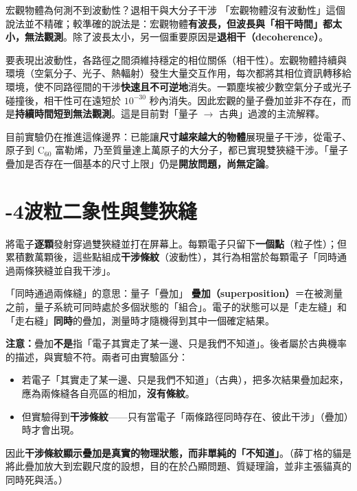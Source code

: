 \documentclass[11pt]{article}
\begin{document}
\begin{延伸框}{宏觀物體為何測不到波動性？退相干與大分子干涉}
「宏觀物體沒有波動性」這個說法並不精確；較準確的說法是：宏觀物體\textbf{有波長，但波長與「相干時間」都太小，無法觀測}。除了波長太小，另一個重要原因是\textbf{退相干（decoherence）}。

要表現出波動性，各路徑之間須維持穩定的相位關係（相干性）。宏觀物體持續與環境（空氣分子、光子、熱輻射）發生大量交互作用，每次都將其相位資訊轉移給環境，使不同路徑間的干涉\textbf{快速且不可逆地}消失。一顆塵埃被少數空氣分子或光子碰撞後，相干性可在遠短於 $10^{-30}$ 秒內消失。因此宏觀的量子疊加並非不存在，而是\textbf{持續時間短到無法觀測}。這是目前對「量子 $\rightarrow$ 古典」過渡的主流解釋。

目前實驗仍在推進這條邊界：已能讓\textbf{尺寸越來越大的物體}展現量子干涉，從電子、原子到 C$_{60}$ 富勒烯，乃至質量達上萬原子的大分子，都已實現雙狹縫干涉。「量子疊加是否存在一個基本的尺寸上限」仍是\textbf{開放問題，尚無定論}。
\end{延伸框}

\section*{-4\quad 波粒二象性與雙狹縫}

將電子\textbf{逐顆}發射穿過雙狹縫並打在屏幕上。每顆電子只留下\textbf{一個點}（粒子性）；但累積數萬顆後，這些點組成\textbf{干涉條紋}（波動性），其行為相當於每顆電子「同時通過兩條狹縫並自我干涉」。


\begin{補充框}{「同時通過兩條縫」的意思：量子「疊加」}
\textbf{疊加（superposition）}＝在被測量之前，量子系統可同時處於多個狀態的「組合」。電子的狀態可以是「走左縫」和「走右縫」\textbf{同時}的疊加，測量時才隨機得到其中一個確定結果。

\textbf{注意：}疊加\textbf{不是}指「電子其實走了某一邊、只是我們不知道」。後者屬於古典機率的描述，與實驗不符。兩者可由實驗區分：
\begin{itemize}\setlength{\itemsep}{1pt}
\item 若電子「其實走了某一邊、只是我們不知道」（古典），把多次結果疊加起來，應為兩條縫各自亮區的相加，\textbf{沒有條紋}。
\item 但實驗得到\textbf{干涉條紋}——只有當電子「兩條路徑同時存在、彼此干涉」（疊加）時才會出現。
\end{itemize}
因此\textbf{干涉條紋顯示疊加是真實的物理狀態，而非單純的「不知道」}。（薛丁格的貓是將此疊加放大到宏觀尺度的設想，目的在於凸顯問題、質疑理論，並非主張貓真的同時死與活。）
\end{補充框}
\end{document}
